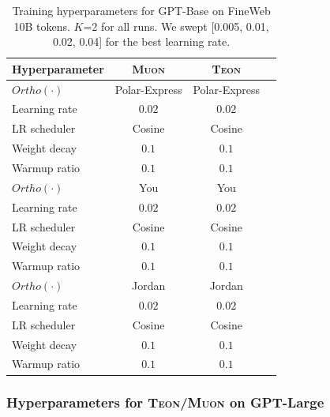 \documentclass{article}
\theoremstyle{plain}
\theoremstyle{definition}
\theoremstyle{remark}
\begin{document}
\begin{table}[htb]
\centering
\begin{tabular}{lccc}
\toprule
\textbf{Hyperparameter} & \textbf{\textsc{Muon}} & \textbf{\textsc{Teon}} \\
\midrule
$Ortho(\cdot)$        & Polar-Express & Polar-Express \\
Learning rate           & $0.02$ & $0.02$ \\
LR scheduler            & Cosine & Cosine \\
Weight decay            & $0.1$ & $0.1$ \\
Warmup ratio            & $0.1$ & $0.1$ \\
\midrule
$Ortho(\cdot)$       & You            & You            \\
Learning rate           & $0.02$ & $0.02$ \\
LR scheduler            & Cosine & Cosine \\
Weight decay            & $0.1$ & $0.1$ \\
Warmup ratio            & $0.1$ & $0.1$ \\
\midrule
$Ortho(\cdot)$        & Jordan         & Jordan         \\
Learning rate           & $0.02$ & $0.02$ \\
LR scheduler            & Cosine & Cosine \\
Weight decay            & $0.1$ & $0.1$ \\
Warmup ratio            & $0.1$ & $0.1$ \\
\bottomrule
\end{tabular}
\caption{Training hyperparameters for GPT-Base on FineWeb 10B tokens. $K$=2 for all runs. We swept [0.005, 0.01, 0.02, 0.04] for the best learning rate.}
\label{tab:hparams_gpt_base}
\end{table}


\subsubsection{Hyperparameters for \textsc{Teon}/\textsc{Muon} on GPT-Large}
\end{document}
